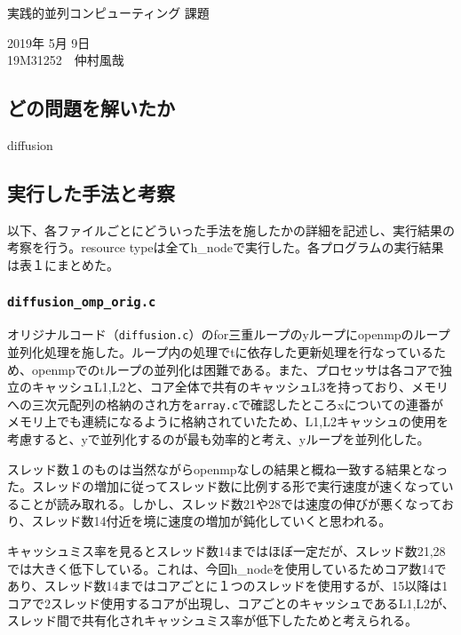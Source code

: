 \documentclass{jarticle}
\begin{document}
\begin{center}
 {\LARGE 実践的並列コンピューティング 課題} %
\end{center}
\begin{flushright}
 2019年 5月 9日 \\ %
 {\large 19M31252　仲村風哉} %
\end{flushright}

\subsection{どの問題を解いたか}
\noindent
[O1]diffusion

\subsection{実行した手法と考察}
以下、各ファイルごとにどういった手法を施したかの詳細を記述し、実行結果の考察を行う。resource typeは全てh\_nodeで実行した。各プログラムの実行結果は表１にまとめた。
\subsubsection{\texttt{diffusion\_omp\_orig.c}}
オリジナルコード（\texttt{diffusion.c}）のfor三重ループのyループにopenmpのループ並列化処理を施した。ループ内の処理でtに依存した更新処理を行なっているため、openmpでのtループの並列化は困難である。また、プロセッサは各コアで独立のキャッシュL1,L2と、コア全体で共有のキャッシュL3を持っており、メモリへの三次元配列の格納のされ方を\texttt{array.c}で確認したところxについての連番がメモリ上でも連続になるように格納されていたため、L1,L2キャッシュの使用を考慮すると、yで並列化するのが最も効率的と考え、yループを並列化した。\par
スレッド数１のものは当然ながらopenmpなしの結果と概ね一致する結果となった。スレッドの増加に従ってスレッド数に比例する形で実行速度が速くなっていることが読み取れる。しかし、スレッド数21や28では速度の伸びが悪くなっており、スレッド数14付近を境に速度の増加が鈍化していくと思われる。\par
キャッシュミス率を見るとスレッド数14まではほぼ一定だが、スレッド数21,28では大きく低下している。これは、今回h\_nodeを使用しているためコア数14であり、スレッド数14まではコアごとに１つのスレッドを使用するが、15以降は1コアで2スレッド使用するコアが出現し、コアごとのキャッシュであるL1,L2が、スレッド間で共有化されキャッシュミス率が低下したためと考えられる。
\end{document}
